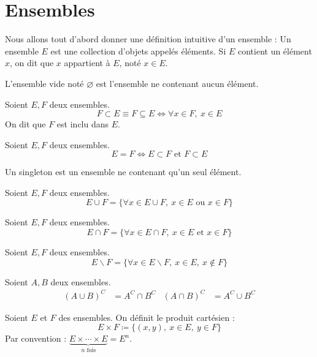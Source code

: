 \chapter{Ensembles}
Nous allons tout d'abord donner une définition intuitive d'un ensemble : Un ensemble $E$ est une collection d'objets appelés éléments. Si $E$ contient un élément $x$, on dit que $x$ appartient à $E$, noté $x \in E$.

\begin{definition}
  L'ensemble vide noté $\varnothing$ est l'ensemble ne contenant aucun élément.
\end{definition}

\begin{definition}[Inclusion]
  Soient $E, F$ deux ensembles.
  $$F \subset E \equiv F \subseteq E \iff \forall x \in F,\ x \in E$$
  On dit que $F$ est inclu dans $E$.
\end{definition}

\begin{definition}
  Soient $E, F$ deux ensembles.
  $$E = F \iff E \subset F \text{ et } F \subset E$$
\end{definition}

\begin{definition}[Singleton]
  Un singleton est un ensemble ne contenant qu'un seul élément.
\end{definition}

\begin{definition}
  Soient $E, F$ deux ensembles.
  \[ E \cup F = \{ \forall x \in E \cup F,\ x \in E \text{ ou } x \in F \} \]
\end{definition}

\begin{definition}
  Soient $E, F$ deux ensembles.
  \[ E \cap F = \{ \forall x \in E \cap F,\ x \in E \text{ et } x \in F \} \]
\end{definition}

\begin{definition}
  Soient $E, F$ deux ensembles.
  \[ E \backslash F = \{ \forall x \in E \backslash F,\ x \in E,\ x \notin F \} \]
\end{definition}

\begin{proposition}
  Soient $A, B$ deux ensembles.
  \begin{align*}
    (A \cup B)^{C} &= A^{C} \cap B^{C} & (A \cap B)^{C} &= A^{C} \cup B^{C}
  \end{align*}
\end{proposition}

\begin{definition}
    Soient $E$ et $F$ des ensembles. On définit le produit cartésien :
    \[ E \times F \coloneqq \{ (x, y),\ x \in E,\ y \in F \} \]
    Par convention : $\underbrace{E \times \cdots \times E}_{n \text{ fois}} = E^n$.
\end{definition}
